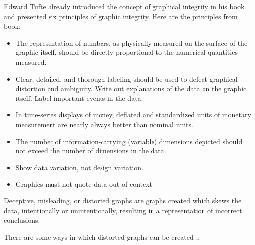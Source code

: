 \documentclass[]{book}
\providecommand{\tightlist}{%
  \setlength{\itemsep}{0pt}\setlength{\parskip}{0pt}}
\theoremstyle{definition}
\theoremstyle{definition}
\theoremstyle{definition}
\theoremstyle{remark}
\begin{document}
Edward Tufte already introduced the concept of graphical integrity in
his book and presented six principles of graphic integrity. Here are the
principles from book:

\begin{itemize}
\tightlist
\item
  The representation of numbers, as physically measured on the surface
  of the graphic itself, should be directly proportional to the
  numerical quantities measured.
\item
  Clear, detailed, and thorough labeling should be used to defeat
  graphical distortion and ambiguity. Write out explanations of the data
  on the graphic itself. Label important events in the data.
\item
  In time-series displays of money, deﬂated and standardized units of
  monetary measurement are nearly always better than nominal units.
\item
  The number of information-carrying (variable) dimensions depicted
  should not exceed the number of dimensions in the data.
\item
  Show data variation, not design variation.
\item
  Graphics must not quote data out of context.
\end{itemize}

Deceptive, misleading, or distorted graphs are graphs created which
skews the data, intentionally or unintentionally, resulting in a
representation of incorrect conclusions.

There are some ways in which distorted graphs can be created
\citep{evil_axes},\citep{mislead_graph_ex}:
\end{document}
